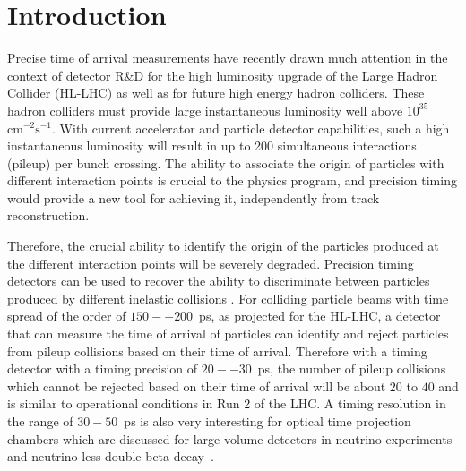 \section{Introduction}
\label{sec:introduction}


Precise time of arrival measurements have recently drawn much attention in the
context of detector R\&D for the high luminosity upgrade of the Large Hadron
Collider (HL-LHC) as well as for future high energy hadron colliders. These
hadron colliders must provide large instantaneous luminosity well above
$10^{35}$~$\mathrm{cm}^{-2}\mathrm{s}^{-1}$. With current accelerator and
particle detector capabilities, such a high instantaneous luminosity will result
in up to 200 simultaneous interactions (pileup) per bunch crossing. 
The ability to associate the origin of particles with different interaction points 
is crucial to the physics program, and precision timing would provide a new tool 
for achieving it, independently from track reconstruction.


Therefore,
the crucial ability to identify the origin of the particles produced at the
different interaction points will be severely degraded. Precision timing
detectors can be used to recover the ability to discriminate between particles
produced by different inelastic collisions \cite{adielba}. For colliding
particle beams with time spread of the order of $150--200$~ps, as projected for
the HL-LHC, a detector that can measure the time of arrival of particles can
identify and reject particles from pileup collisions based on their time of
arrival. Therefore with a timing detector with a timing precision of
$20--30$~ps, the number of pileup collisions which cannot be rejected based on
their time of arrival will be about $20$ to $40$ and is similar to operational
conditions in Run 2 of the LHC. A timing resolution in the range of $30-50$~ps
is also very interesting for optical time projection chambers which are
discussed for large volume detectors in neutrino experiments and neutrino-less
double-beta decay~\cite{Aberle:2013jba, otpc}. 

